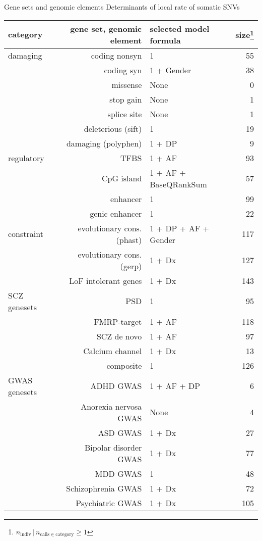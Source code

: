 \documentclass[usenames,dvipsnames]{beamer}
\begin{document}
\begin{frame}{Gene sets and genomic elements}
	{Determinants of local rate of somatic SNVs}
\begin{center}
\tiny
\begin{tabular}{lrlr}
category & gene set, genomic element & selected model formula & size\footnote{\(n_\mathrm{indiv} \,|\, n_{\mathrm{calls} \in \mathrm{category}} \ge 1\)} \\
\hline
\hline
damaging & coding nonsyn & 1 & 55 \\
& coding syn & 1 + Gender & 38 \\
& missense & None & 0 \\
& stop gain & None & 1 \\
& splice site & None & 1 \\
& deleterious (sift) & 1 & 19 \\
& damaging (polyphen) & 1 + DP & 9 \\
\hline
regulatory & TFBS & 1 + AF & 93 \\
& CpG island & 1 + AF + BaseQRankSum & 57 \\
& enhancer & 1 & 99 \\
& genic enhancer & 1 & 22 \\
\hline
constraint & evolutionary cons. (phast) & 1 + DP + AF + Gender & 117 \\
& evolutionary cons. (gerp) & 1 + \alert{Dx} & 127 \\
& LoF intolerant genes & 1 + \alert{Dx} & 143 \\
\hline
SCZ genesets & PSD & 1 & 95 \\
& FMRP-target & 1 + AF & 118 \\
& SCZ de novo & 1 + AF & 97 \\
& Calcium channel & 1 + \alert{Dx} & 13 \\
& composite & 1 & 126 \\
\hline
GWAS genesets & ADHD GWAS & 1 + AF + DP & 6 \\
& Anorexia nervosa GWAS & None & 4 \\
& ASD GWAS & 1 + \alert{Dx} & 27 \\
& Bipolar disorder GWAS & 1 + \alert{Dx} & 77 \\
& MDD GWAS & 1 & 48 \\
& Schizophrenia GWAS & 1 + \alert{Dx} & 72 \\
& Psychiatric GWAS & 1 + \alert{Dx} & 105 \\
\end{tabular}
\end{center}
\end{frame}
\end{document}
